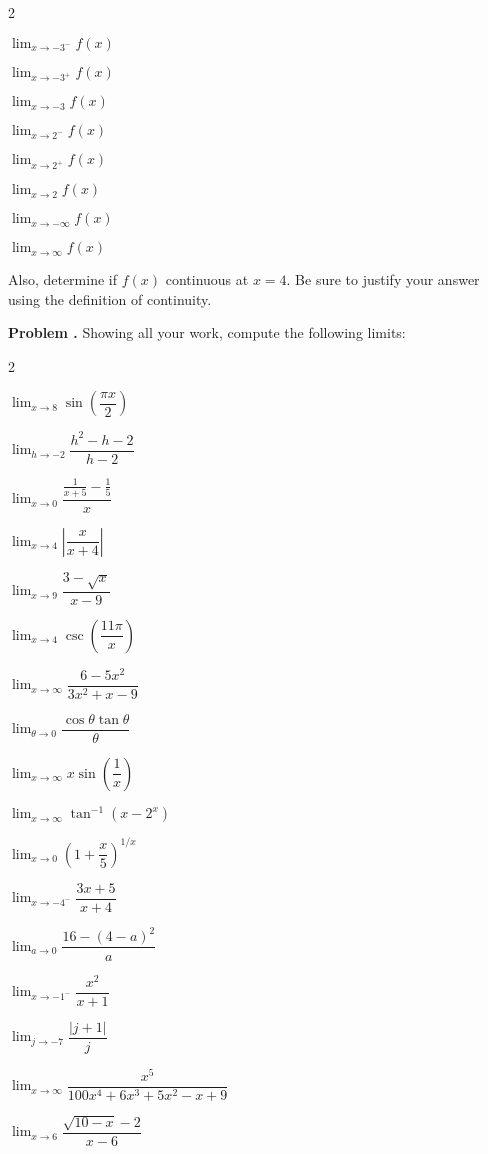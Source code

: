 \documentclass[11pt,letterpaper]{article}
\newenvironment{2enumerate}{%
	\begin{enumerate}[(a)]
	\begin{multicols}{2}
	}{%
	\end{multicols}
	\end{enumerate}
}
\newcommand{\ds}{\displaystyle}
\newcommand{\pspace}{\par\vspace{\baselineskip}}
\newcounter{problem}
\newcommand{\prob}{\stepcounter{problem}%
\noindent\textbf{Problem \theproblem. }}
\begin{document}
        \begin{2enumerate}
        \item $\ds\lim_{x \to -3^-} f(x)$  
        \item $\ds\lim_{x \to -3^+} f(x)$ 
        \item $\ds\lim_{x \to -3} f(x)$ 
        \item $\ds\lim_{x \to 2^-} f(x)$ 
        \item $\ds\lim_{x \to 2^+} f(x)$ 
        \item $\ds\lim_{x \to 2} f(x)$ 
        \item $\ds\lim_{x \to -\infty} f(x)$  
        \item $\ds\lim_{x \to \infty} f(x)$ 
        \end{2enumerate}
Also, determine if $f(x)$ continuous at $x=4$. Be sure to justify your answer using the definition of continuity. \pspace



\prob Showing all your work, compute the following limits:
	\begin{2enumerate}
	\item $\ds\lim_{x \to 8} \sin \left( \dfrac{\pi x}{2} \right)$
	\item $\ds\lim_{h \to -2} \dfrac{h^2 - h - 2}{h - 2}$
	\item $\ds\lim_{x \to 0} \dfrac{\frac{1}{x + 5} - \frac{1}{5}}{x}$
	\item $\ds\lim_{x \to 4} \left| \dfrac{x}{x + 4} \right|$
	\item $\ds\lim_{x \to 9} \dfrac{3 - \sqrt{x}}{x - 9}$
	\item $\ds\lim_{x \to 4} \csc \left( \dfrac{11\pi}{x} \right)$
	\item $\ds\lim_{x \to \infty} \dfrac{6 - 5x^2}{3x^2 + x - 9}$
	\item $\ds\lim_{\theta \to 0} \dfrac{\cos \theta \tan \theta}{\theta}$
	\item $\ds\lim_{x \to \infty} x \sin \left( \dfrac{1}{x} \right)$
	\item $\ds\lim_{x \to \infty} \tan^{-1} \left( x - 2^x \right)$
	\item $\ds\lim_{x \to 0} \left(1 + \dfrac{x}{5} \right)^{1/x}$
	\item $\ds\lim_{x \to -4^-} \dfrac{3x + 5}{x + 4}$
	\item $\ds\lim_{a \to 0} \dfrac{16 - (4 - a)^2}{a}$
	\item $\ds\lim_{x \to -1^-} \dfrac{x^2}{x + 1}$
	\item $\ds\lim_{j \to -7} \dfrac{|j + 1|}{j}$
	\item $\ds\lim_{x \to \infty} \dfrac{x^5}{100x^4 + 6x^3 + 5x^2 - x + 9}$
	\item $\ds\lim_{x \to 6} \dfrac{\sqrt{10 - x} - 2}{x - 6}$
	\end{2enumerate}
\end{document}
